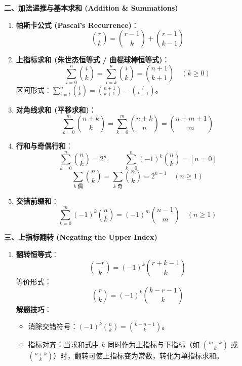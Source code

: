 \textbf{二、加法递推与基本求和 (Addition \& Summations)}
\begin{enumerate}
    \item \textbf{帕斯卡公式 (Pascal's Recurrence)}：
    \[
    \binom{r}{k} = \binom{r-1}{k} + \binom{r-1}{k-1}
    \]
    \item \textbf{上指标求和 (朱世杰恒等式 / 曲棍球棒恒等式)}：
    \[
    \sum_{i=0}^n \binom{i}{k} = \sum_{i=k}^n \binom{i}{k} = \binom{n+1}{k+1} \quad (k \ge 0)
    \]
    区间形式：$\sum_{i=l}^n \binom{i}{k} = \binom{n+1}{k+1} - \binom{l}{k+1}$。
    \item \textbf{对角线求和 (平移求和)}：
    \[
    \sum_{k=0}^m \binom{n+k}{k} = \sum_{k=0}^m \binom{n+k}{n} = \binom{n+m+1}{m}
    \]
    \item \textbf{行和与奇偶行和}：
    \[
    \sum_{k=0}^n \binom{n}{k} = 2^n, \qquad \sum_{k=0}^n (-1)^k \binom{n}{k} = [n = 0]
    \]
    \[
    \sum_{k \text{ 偶}} \binom{n}{k} = \sum_{k \text{ 奇}} \binom{n}{k} = 2^{n-1} \quad (n \ge 1)
    \]
    \item \textbf{交错前缀和}：
    \[
    \sum_{k=0}^m (-1)^k \binom{n}{k} = (-1)^m \binom{n-1}{m} \quad (n \ge 1)
    \]
\end{enumerate}

\textbf{三、上指标翻转 (Negating the Upper Index)}
\begin{enumerate}
    \item \textbf{翻转恒等式}：
    \[
    \binom{-r}{k} = (-1)^k \binom{r+k-1}{k}
    \]
    等价形式：
    \[
    \binom{r}{k} = (-1)^k \binom{k-r-1}{k}
    \]
    \textbf{解题技巧}：
    \begin{itemize}
        \item 消除交错符号：$(-1)^k \binom{n}{k} = \binom{k-n-1}{k}$。
        \item 指标对齐：当求和式中 $k$ 同时作为上指标与下指标（如 $\binom{m-k}{k}$ 或 $\binom{n+k}{k}$）时，翻转可使上指标变为常数，转化为单指标求和。
    \end{itemize}
\end{enumerate}

